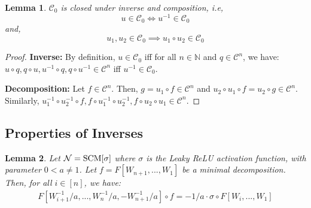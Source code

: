 \documentclass{article} %
\newtheorem{lem}{Lemma}
\begin{document}
\begin{lem}\label{lem:closureC0}  $\mathcal{C}_0$ is closed under inverse and composition, i.e, 
\begin{equation}
u \in \mathcal{C}_0 \iff u^{-1} \in \mathcal{C}_0
\end{equation}
and,
\begin{equation}
u_1,u_2 \in \mathcal{C}_0 \implies u_1 \circ u_2 \in \mathcal{C}_0
\end{equation}
\end{lem}

\begin{proof} 
\textbf{Inverse:} By definition, $u \in \mathcal{C}_0$ iff for all $n \in \mathbb{N}$ and $q \in \mathcal{C}^n$, we have: $u \circ q,q\circ u,u^{-1}\circ q,q \circ u^{-1} \in \mathcal{C}^n$ iff $u^{-1} \in \mathcal{C}_0$.

\textbf{Decomposition:} Let $f \in \mathcal{C}^n$. Then, $g = u_1 \circ f \in \mathcal{C}^n$ and $u_2 \circ u_1 \circ f = u_2 \circ g \in \mathcal{C}^n$. Similarly, $u^{-1}_1\circ u^{-1}_2 \circ f, f \circ u^{-1}_1\circ u^{-1}_2 , f \circ u_2 \circ u_1 \in \mathcal{C}^n$.
\end{proof}


\subsection{Properties of Inverses}
\label{sec:propinv}


\begin{lem}\label{lem:Fp} Let $\mathcal{N} = \textnormal{SCM}[\sigma]$ where $\sigma$ is the Leaky ReLU activation function, with parameter $0<a \neq 1$. Let $f = F[W_{n+1},...,W_1]$ be a minimal decomposition. Then, for all $i \in [n]$, we have:
\begin{equation}
\begin{aligned}
F[W^{-1}_{i+1}/a,...,W^{-1}_n/a,-W^{-1}_{n+1}/a] \circ f = -1/a \cdot \sigma \circ F[W_{i},...,W_1]
\end{aligned}
\end{equation}
\end{lem}
\end{document}
